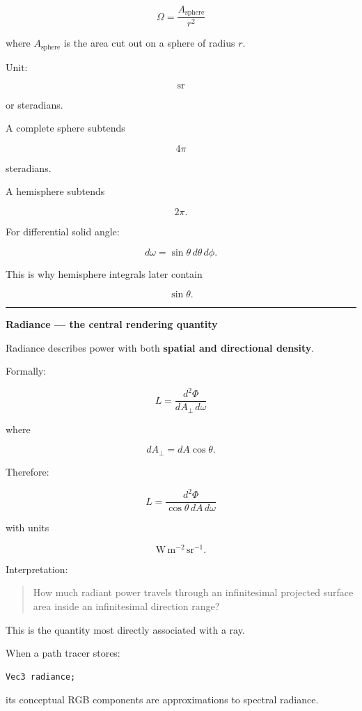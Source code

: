 \[
\boxed{
\Omega=\frac{A_{\text{sphere}}}{r^2}
}
\]

where \(A_{\text{sphere}}\) is the area cut out on a sphere of radius \(r\).

Unit:

\[
\mathrm{sr}
\]

or steradians.

A complete sphere subtends

\[
4\pi
\]

steradians.

A hemisphere subtends

\[
2\pi.
\]

For differential solid angle:

\[
d\omega
=
\sin\theta\,d\theta\,d\phi.
\]

This is why hemisphere integrals later contain

\[
\sin\theta.
\]

\begin{center}\rule{0.5\linewidth}{0.5pt}\end{center}

\textbf{Radiance --- the central rendering quantity}

Radiance describes power with both \textbf{spatial and directional density}.

Formally:

\[
\boxed{
L=
\frac{d^2\Phi}
{dA_\perp\,d\omega}
}
\]

where

\[
dA_\perp
=
dA\cos\theta.
\]

Therefore:

\[
\boxed{
L=
\frac{d^2\Phi}
{\cos\theta\,dA\,d\omega}
}
\]

with units

\[
\mathrm{W\,m^{-2}\,sr^{-1}}.
\]

Interpretation:

\begin{quote}
How much radiant power travels through an infinitesimal projected surface area inside an infinitesimal direction range?
\end{quote}

This is the quantity most directly associated with a ray.

When a path tracer stores:

\begin{verbatim}
Vec3 radiance;
\end{verbatim}

its conceptual RGB components are approximations to spectral radiance.


